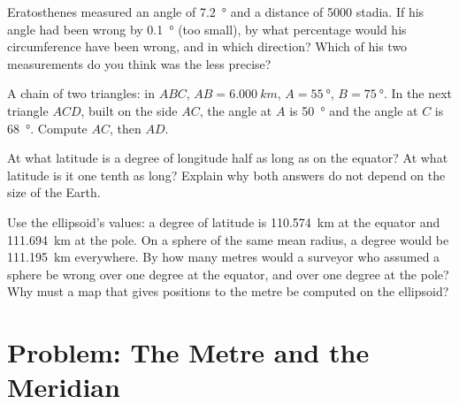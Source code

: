 \begin{exercise}[$\star\star\star$]\label{exo:g10:measuring-the-earth:12}
Eratosthenes measured an angle of \qty{7.2}{\degree} and a distance of 5000
stadia. If his angle had been wrong by \qty{0.1}{\degree} (too small), by what
percentage would his circumference have been wrong, and in which direction?
Which of his two measurements do you think was the less precise?
\end{exercise}

\begin{exercise}[$\star\star\star$]\label{exo:g10:measuring-the-earth:13}
A chain of two triangles: in $ABC$, $AB = \qty{6.000}{km}$,
$A = \qty{55}{\degree}$, $B = \qty{75}{\degree}$. In the next triangle $ACD$,
built on the side $AC$, the angle at $A$ is \qty{50}{\degree} and the angle
at $C$ is \qty{68}{\degree}. Compute $AC$, then $AD$.
\end{exercise}

\begin{exercise}[$\star\star\star$]\label{exo:g10:measuring-the-earth:14}
At what latitude is a degree of longitude half as long as on the equator?
At what latitude is it one tenth as long? Explain why both answers do not
depend on the size of the Earth.
\end{exercise}

\begin{exercise}[$\star\star\star$]\label{exo:g10:measuring-the-earth:15}
Use the ellipsoid's values: a degree of latitude is \qty{110.574}{km} at the
equator and \qty{111.694}{km} at the pole. On a sphere of the same mean
radius, a degree would be \qty{111.195}{km} everywhere. By how many metres
would a surveyor who assumed a sphere be wrong over one degree at the
equator, and over one degree at the pole? Why must a map that gives
positions to the metre be computed on the ellipsoid?
\end{exercise}

\section{Problem: The Metre and the Meridian}

